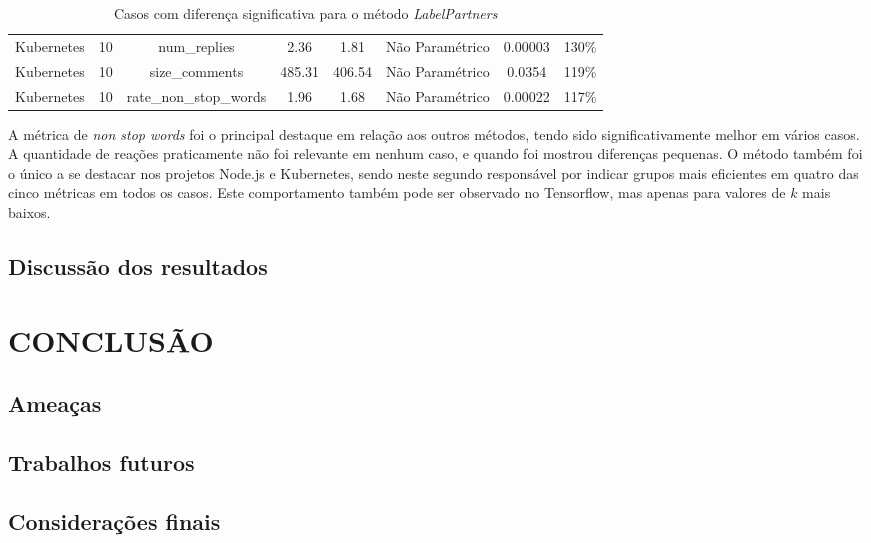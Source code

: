 \documentclass[12pt,openany,oneside,a4paper,english,brazil]{abntbibufjf}
\begin{document}
\begin{table}[htbp]
{\begin{tabular}{|c|c|c|c|c|c|c|c|}
Kubernetes & 10 & num\_replies           & 2.36               & 1.81                   & Não Paramétrico & 0.00003 & 130\%     \\
Kubernetes & 10 & size\_comments         & 485.31             & 406.54                 & Não Paramétrico & 0.0354  & 119\%     \\
Kubernetes & 10 & rate\_non\_stop\_words & 1.96               & 1.68                   & Não Paramétrico & 0.00022 & 117\%
\end{tabular}%
}
\hline
\caption{Casos com diferença significativa para o método \textit{LabelPartners}}
\label{tab:resultados-labelpartners}
\end{table}

A métrica de \textit{non stop words} foi o principal destaque em relação aos outros métodos, tendo sido significativamente melhor em vários casos. A quantidade de reações praticamente não foi relevante em nenhum caso, e quando foi mostrou diferenças pequenas. O método também foi o único a se destacar nos projetos Node.js e Kubernetes, sendo neste segundo responsável por indicar grupos mais eficientes em quatro das cinco métricas em todos os casos. Este comportamento também pode ser observado no Tensorflow, mas apenas para valores de $k$ mais baixos. 

  \section{Discussão dos resultados}\label{sec:discussao}

\chapter{CONCLUSÃO}\label{chap:conclusao}

  \section{Ameaças}\label{sec:ameacas}

  \section{Trabalhos futuros}\label{sec:trabalhos_futuros}

  \section{Considerações finais}\label{sec:consideracoes_finais}






\postextual








\end{document}

